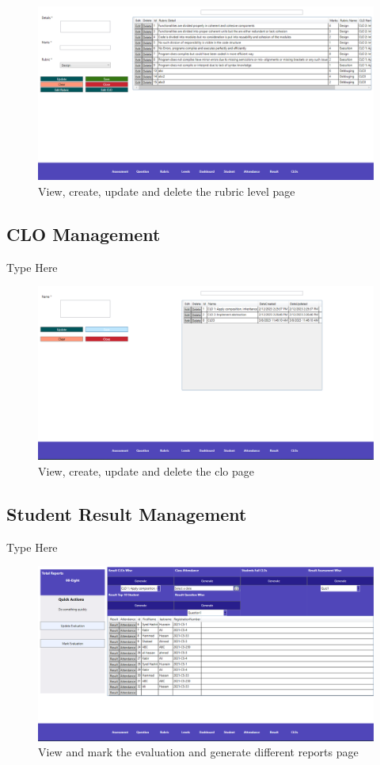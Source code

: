 \documentclass[12pt,a4paper]{article}
\begin{document}
\begin{figure}[H]
  \centering
  \includegraphics[scale=0.5]{GUIRubricLevel}

  \caption{View, create, update and delete the rubric level page}
\end{figure}

\subsection{CLO Management}
Type Here

\begin{figure}[H]
  \centering
  \includegraphics[scale=0.5]{GUICLO}

  \caption{View, create, update and delete the clo page}
\end{figure}

\subsection{Student Result Management}
Type Here
\begin{figure}[H]
  \centering
  \includegraphics[scale=0.5]{GUIResult}

  \caption{View and mark the evaluation and generate different reports page}
\end{figure}
\end{document}

